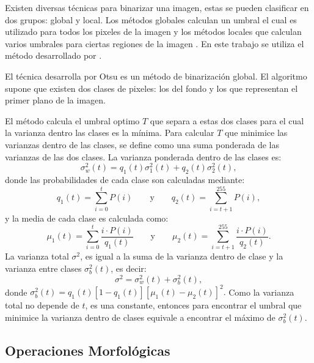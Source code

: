 Existen diversas técnicas para binarizar una imagen, estas se pueden clasificar en dos grupos: global y local. Los métodos globales calculan un umbral el cual es utilizado para todos los pixeles de la imagen y los métodos locales que calculan varios umbrales para ciertas regiones de la imagen \citep{Chaki2014}.  En este trabajo se utiliza el método desarrollado por \citep{Otsu1979}.

El técnica desarrolla por Otsu es un método de binarizaci\'on global. El algoritmo supone que existen dos clases de pixeles: los del fondo y los que representan el primer plano de la imagen. 

El método calcula el umbral optimo $T$ que separa a estas dos clases para el cual la varianza dentro las clases es la mínima. Para calcular $T$ que minimice las varianzas dentro de las clases, se define como una suma ponderada de las varianzas de las dos clases.
La varianza ponderada dentro de las clases es: 
\begin{equation}
\sigma^2_w(t) = q_1(t)\sigma^2_1(t) + q_2(t)\sigma^2_2(t),
\end{equation} 
donde las probabilidades de cada clase son calculadas mediante:  
\begin{equation}
q_1(t) = \sum ^t_{i=0} P(i) 
\qquad \text{y} \qquad
q_2(t) = \sum ^{255}_{i=t+1} P(i),
\end{equation} 
y la media de cada clase es calculada como:  
\begin{equation}
\mu_1(t) = \sum ^t_{i=0} \frac{i \cdot P(i)}{q_1(t)} 
\qquad \text{y} \qquad
\mu_2(t) = \sum ^{255}_{i=t+1} \frac{i \cdot P(i)}{q_2(t)}.
\end{equation} 
La varianza total $\sigma^2$, es igual a la suma de la varianza dentro de clase y la varianza entre clases $\sigma^2_b(t)$, es decir: 
\begin{equation}
\sigma^2 = \sigma^2_w(t) + \sigma^2_b(t),
\end{equation}
donde $\sigma^2_b(t)= q_1(t)\left[ 1- q_1(t) \right]\left[ \mu_1(t) - \mu_2(t) \right]^2 .$  
Como la varianza total no depende de $t$, es una constante, entonces para encontrar el umbral que minimice la varianza dentro de clases equivale a encontrar el máximo de $\sigma^2_b(t)$. 

\subsection{Operaciones Morfológicas}\label{subsec:OperacionesMorfologicas} 

